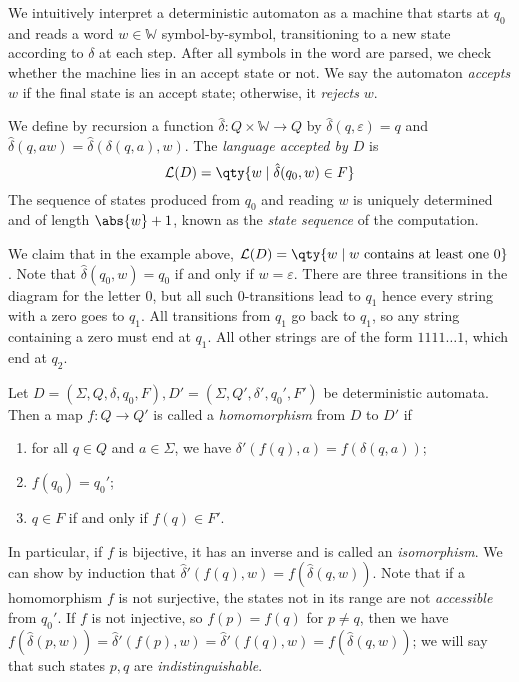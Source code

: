 We intuitively interpret a deterministic automaton as a machine that starts at \( q_0 \) and reads a word \( w \in \mathbb W \) symbol-by-symbol, transitioning to a new state according to \( \delta \) at each step.
After all symbols in the word are parsed, we check whether the machine lies in an accept state or not.
We say the automaton \emph{accepts} \( w \) if the final state is an accept state; otherwise, it \emph{rejects} \( w \).
\begin{definition}
	We define by recursion a function \( \hat\delta \colon Q \times \mathbb W \to Q \) by \( \hat\delta(q,\varepsilon) = q \) and \( \hat\delta(q,aw) = \hat\delta(\delta(q,a),w) \).
	The \emph{language accepted by \( D \)} is
	\[ \mathcal L(D) = \qty{w \mid \hat \delta(q_0, w) \in F} \]
	The sequence of states produced from \( q_0 \) and reading \( w \) is uniquely determined and of length \( \abs{w} + 1 \), known as the \emph{state sequence} of the computation.
\end{definition}
We claim that in the example above, \( \mathcal L(D) = \qty{w \mid w \text{ contains at least one } 0} \).
Note that \( \hat\delta(q_0,w) = q_0 \) if and only if \( w = \varepsilon \).
There are three transitions in the diagram for the letter 0, but all such 0-transitions lead to \( q_1 \) hence every string with a zero goes to \( q_1 \).
All transitions from \( q_1 \) go back to \( q_1 \), so any string containing a zero must end at \( q_1 \).
All other strings are of the form \( 1111\dots 1 \), which end at \( q_2 \).
\begin{definition}
	Let \( D = (\Sigma, Q, \delta, q_0, F), D' = (\Sigma, Q', \delta', q_0', F') \) be deterministic automata.
	Then a map \( f \colon Q \to Q' \) is called a \emph{homomorphism} from \( D \) to \( D' \) if
	\begin{enumerate}
		\item for all \( q \in Q \) and \( a \in \Sigma \), we have \( \delta'(f(q),a) = f(\delta(q,a)) \);
		\item \( f(q_0) = q_0' \);
		\item \( q \in F \) if and only if \( f(q) \in F' \).
	\end{enumerate}
\end{definition}
In particular, if \( f \) is bijective, it has an inverse and is called an \emph{isomorphism}.
We can show by induction that \( \hat \delta'(f(q),w) = f(\hat\delta(q,w)) \).
Note that if a homomorphism \( f \) is not surjective, the states not in its range are not \emph{accessible} from \( q_0' \).
If \( f \) is not injective, so \( f(p) = f(q) \) for \( p \neq q \), then we have \( f(\hat\delta(p,w)) = \hat\delta'(f(p),w) = \hat\delta'(f(q),w) = f(\hat\delta(q,w)) \); we will say that such states \( p, q \) are \emph{indistinguishable}.
